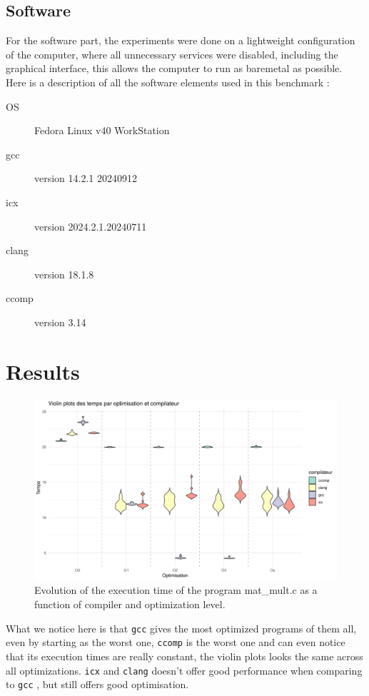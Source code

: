 \documentclass{rapport}
\newcommand{\gcc}{\texttt{gcc} }
\newcommand{\icx}{\texttt{icx} }
\newcommand{\clang}{\texttt{clang} }
\newcommand{\comp}{\texttt{ccomp} }
\begin{document}
\subsection*{Software}
For the software part, the experiments were done on a lightweight configuration of the computer, where all unnecessary services were disabled, including the graphical interface, this allows the computer to run as baremetal as possible. \newline
Here is a description of all the software elements used in this benchmark :
\begin{description}
    \item[OS] Fedora Linux v40 WorkStation
    \item[gcc] version 14.2.1 20240912
    \item[icx] version 2024.2.1.20240711
    \item[clang] version 18.1.8
    \item[ccomp] version 3.14
\end{description}


\section{Results}
\begin{figure}[H]
\centering
\includegraphics[width=1\textwidth]{img/plots/violin_plot_mat_mult.png}
\caption{Evolution of the execution time of the program mat\_mult.c as a function of compiler and optimization level.}
\label{fig:image1}
\end{figure}
What we notice here is that \gcc gives the most optimized programs of them all, even by starting as the worst one, \comp is the worst one and can even notice that its execution times are really constant, the violin plots looks the same across all optimizations. \newline
\icx and \clang doesn't offer good performance when comparing to \gcc, but still offers good optimisation.
\end{document}
